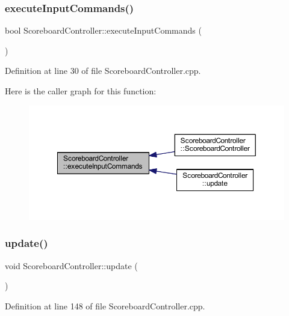 \subsubsection{\texorpdfstring{execute\+Input\+Commands()}{executeInputCommands()}}
{\footnotesize\ttfamily bool Scoreboard\+Controller\+::execute\+Input\+Commands (\begin{DoxyParamCaption}{ }\end{DoxyParamCaption})}



Definition at line 30 of file Scoreboard\+Controller.\+cpp.

Here is the caller graph for this function\+:\nopagebreak
\begin{figure}[H]
\begin{center}
\leavevmode
\includegraphics[width=350pt]{class_scoreboard_controller_a5365e2a960e16cf49dca0852682b0499_icgraph}
\end{center}
\end{figure}
\mbox{\label{class_scoreboard_controller_a05414b34fd7f4455ddb0ac98490639dc}} 
\subsubsection{\texorpdfstring{update()}{update()}}
{\footnotesize\ttfamily void Scoreboard\+Controller\+::update (\begin{DoxyParamCaption}{ }\end{DoxyParamCaption})}



Definition at line 148 of file Scoreboard\+Controller.\+cpp.

